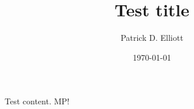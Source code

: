 \documentclass[nofonts,nobib]{tufte-handout}
\title{Test title}
\author{Patrick D. Elliott}
\date{\today}
\begin{document}


\maketitle

Test content. \ac{MP!}

\printbibliography
\end{document}
